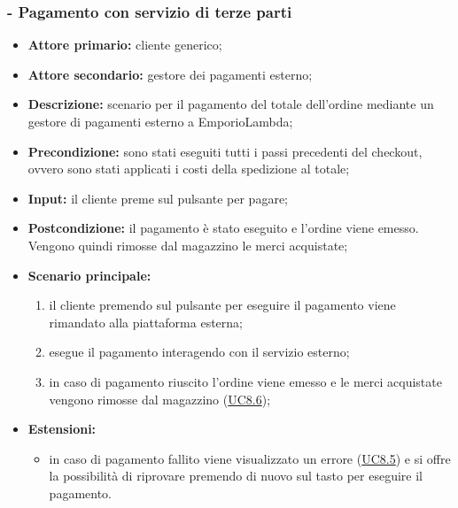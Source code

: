 \stepsubUserCase
\subsubsection{ - Pagamento con servizio di terze parti}
\begin{itemize}
    \item \textbf{Attore primario:} cliente generico;
    \item \textbf{Attore secondario:} gestore dei pagamenti esterno;
    \item \textbf{Descrizione:} scenario per il pagamento del totale dell'ordine mediante un gestore di pagamenti esterno a EmporioLambda;
    \item \textbf{Precondizione:} sono stati eseguiti tutti i passi precedenti del checkout, ovvero sono stati applicati i costi della spedizione al totale;
    \item \textbf{Input:} il cliente preme sul pulsante per pagare;
    \item \textbf{Postcondizione:} il pagamento è stato eseguito e l'ordine viene emesso. Vengono quindi rimosse dal magazzino le merci acquistate;
    \item \textbf{Scenario principale:}
          \begin{enumerate}
              \item il cliente premendo sul pulsante per eseguire il pagamento viene rimandato alla piattaforma esterna;
              \item esegue il pagamento interagendo con il servizio esterno;
              \item in caso di pagamento riuscito l'ordine viene emesso e le merci acquistate vengono rimosse dal magazzino (\hyperref[UC8.6]{UC8.6});
          \end{enumerate}
    \item \textbf{Estensioni:}
          \begin{itemize}
              \item in caso di pagamento fallito viene visualizzato un errore (\hyperref[UC8.5]{UC8.5}) e si offre la possibilità di riprovare premendo di nuovo sul tasto per eseguire il pagamento.
          \end{itemize}
\end{itemize}

\stepsubUserCase
